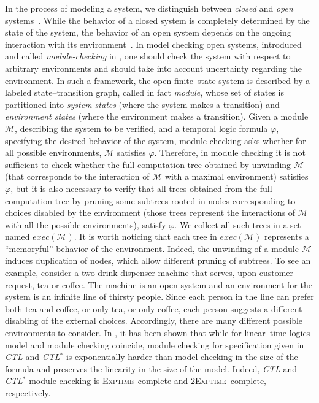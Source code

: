 \documentclass{LMCS}
\theoremstyle{plain}
\def \CTL           {\emph{CTL}\xspace}
\def \CTLSTAR       {\emph{CTL$^*$}\xspace}
\def \EXPTIME       {\textsc{Exptime}\xspace}
\def \M             {\mathcal{M}}
\def \TWOEXPTIME    {\textsc{2Exptime}\xspace}
\begin{document}
In the process of modeling a system, we distinguish between \emph{closed} and
\emph{open} systems~\cite{HP85}. While the behavior of a closed system is
completely determined by the state of the system, the behavior of an open
system depends on the ongoing interaction with its environment~\cite{Hoa85}. In
model checking open systems, introduced and called \emph{module-checking} in
\cite{KVW01}, one should check the system with respect to arbitrary
environments and should take into account uncertainty regarding the
environment. In such a framework, the open finite--state system is described by
a labeled state--transition graph, called in fact \emph{module}, whose set of
states is partitioned into \emph{system states} (where the system makes a
transition) and \emph{environment states} (where the environment makes a
transition). Given a module $\M$, describing the system to be verified, and a
temporal logic formula $\varphi$, specifying the desired behavior of the
system, module checking asks whether for all possible environments, $\M$
satisfies $\varphi$. Therefore, in module checking it is not sufficient to
check whether the full computation tree obtained by unwinding $\M$ (that
corresponds to the interaction of $\M$ with a maximal environment) satisfies
$\varphi$, but it is also necessary to verify that all trees obtained from the
full computation tree by pruning some subtrees rooted in nodes corresponding to
choices disabled by the environment (those trees represent the interactions of
$\M$ with all the possible environments), satisfy $\varphi$. We collect all
such trees in a set named $exec(\M)$. It is worth noticing that each tree in
$exec(\M)$ represents a ``memoryful'' behavior of the environment. Indeed, the
unwinding of a module $\M$ induces duplication of nodes, which allow different
pruning of subtrees. To see an example, consider a two-drink dispenser machine
that serves, upon customer request, tea or coffee. The machine is an open
system and an environment for the system is an infinite line of thirsty people.
Since each person in the line can prefer both tea and coffee, or only tea, or
only coffee, each person suggests a different disabling of the external
choices. Accordingly, there are many different possible environments to
consider. In \cite{KV97,KVW01}, it has been shown that while for linear--time
logics model and module checking coincide, module checking for specification
given in \CTL and \CTLSTAR is exponentially harder than model checking in the
size of the formula and preserves the linearity in the size of the model.
Indeed, \CTL and \CTLSTAR module checking is \EXPTIME--complete and
\TWOEXPTIME--complete, respectively.
\end{document}
